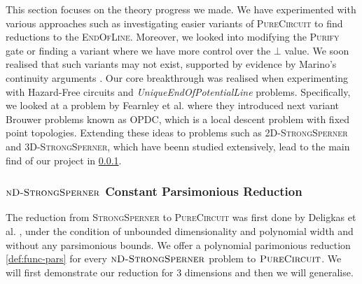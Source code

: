 This section focuses on the theory progress we made.
We have experimented with various approaches
such as investigating easier variants of \textsc{PureCircuit} to find reductions
to the \textsc{EndOfLine}. Moreover, we looked into modifying the \textsc{Purify} gate
or finding a variant where we have more control over the $\bot$ value. We soon
realised that such variants may not exist, supported by evidence by Marino's continuity 
arguments \cite{marino_GeneralTheoryMetastable_1981}.
Our core breakthrough was realised when experimenting with
Hazard-Free circuits and \textit{UniqueEndOfPotentialLine} problems. Specifically,
we looked at a problem by Fearnley et al. \cite{fearnley_UniqueEndPotential_2020} where
they introduced next variant Brouwer problems known as \textsc{OPDC}, which is a 
local descent problem with fixed point topologies. Extending these ideas
to problems such as \textsc{2D-StrongSperner} and \textsc{3D-StrongSperner},
which have beenn studied extensively, lead to the main find of our project in \ref{sect:main-result}.






\subsubsection{$\textnormal{\textsc{nD-StrongSperner}}$ Constant Parsimonious Reduction} \label{sect:main-result}

The reduction from \textsc{StrongSperner} to \textsc{PureCircuit} was first
done by Deligkas et al. \cite{deligkas_PureCircuitTightInapproximability_2024},
under the condition of unbounded dimensionality and polynomial width and without any parsimonious bounds.
We offer a polynomial parimonious reduction \ref{def:func-pars}
for every $\textnormal{\textsc{nD-StrongSperner}}$ problem to  $\textnormal{\textsc{PureCircuit}}$.
We will first demonstrate our reduction for 3 dimensions and then we will generalise.

